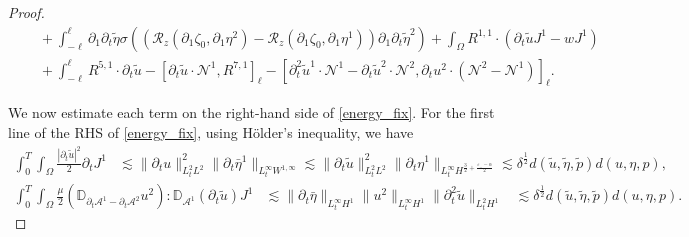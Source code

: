 \documentclass[letterpaper,reqno,10pt,twoside]{amsart}
\theoremstyle{definition}
\theoremstyle{remark}
\def\p{\partial}
\def\Om{\Omega}
\begin{document}
\begin{proof}
\begin{equation}
\begin{aligned}
					&\quad+\int_{-\ell}^{\ell}\p_{1}\p_{t}\tilde{\eta}\sigma ((\mathcal{R}_{z}(\p_{1}\zeta_{0},\p_{1}\eta^{2})-\mathcal{R}_{z}(\p_{1}\zeta_{0},\p_{1}\eta^{1}))\p_{1}\p_{t}\tilde{\eta}^{2})+\int_\Om R^{1,1}\cdot(\p_t\tilde{u}J^1-wJ^{1})\\
					&\quad+\int_{-\ell}^{\ell} R^{5,1}\cdot \p_{t}\tilde{u}-[\p_t\tilde{u}\cdot\mathcal{N}^1,  R^{7,1}]_\ell-[\p_{t}^{2}\tilde{u}^{1}\cdot \mathcal{N}^{1}-\p_{t}\tilde{u}^{2}\cdot \mathcal{N}^{2},\p_{t}u^{2}\cdot (\mathcal{N}^{2}-\mathcal{N}^{1})]_{\ell}.
				\end{aligned}
			\end{equation}
			
			We now estimate each term on the right-hand side of \eqref{energy_fix}. For the first line of the RHS of \eqref{energy_fix}, using H\"older's inequality, we have
			\[
			\begin{aligned}
				\int_{0}^{T}\int_{\Omega} \frac{|\p_{t}\tilde{u}|^{2}}{2}\p_{t}J^{1}&\lesssim \|\p_{t}u\|_{L_{t}^{2}L^{2}}^{2}\|\p_{t}\bar{\eta}^{1}\|_{L_{t}^{\infty
					}W^{1,\infty}}\lesssim \|\p_{t}\tilde{u}\|_{L_{t}^{2}L^{2}}^{2}\|\p_{t}{\eta}^{1}\|_{L_{t}^{\infty
					}H^{\frac{3}{2}+\frac{\varepsilon_{-}-\alpha}{2}}}\lesssim\delta^{\frac{1}{2}}d(\tilde{u},\tilde{\eta},\tilde{p})d(u,\eta,p),
			\end{aligned}
			\]
			\[
			\begin{aligned}
				\int_{0}^{T}\int_{\Omega}\frac{\mu}{2}(\mathbb{D}_{\p_{t}\mathcal{A}^{1}-\p_{t}\mathcal{A}^{2}}u^{2}):\mathbb{D}_{\mathcal{A}^{1}}(\p_{t}\tilde{u})J^{1}&\lesssim \|\p_{t}\bar{\eta}\|_{L_{t}^{\infty}H^{1}}\|u^{2}\|_{L_{t}^{\infty}H^{1}}\|\p_{t}^{2}\tilde{u}\|_{L_{t}^{2}H^{1}}&\lesssim \delta^{\frac{1}{2}}d(\tilde{u},\tilde{\eta},\tilde{p})d(u,\eta,p).
			\end{aligned}
			\]
			

\end{proof}
\end{document}
